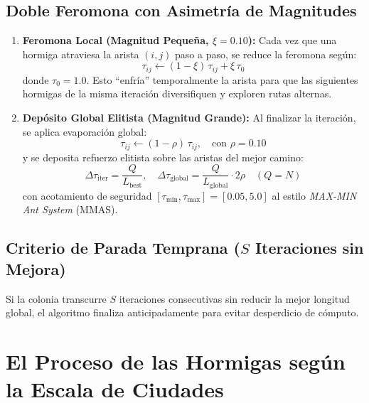 \documentclass[11pt,a4paper]{article}
\begin{document}
\subsection{Doble Feromona con Asimetría de Magnitudes}
\begin{enumerate}
    \item \textbf{Feromona Local (Magnitud Pequeña, $\xi = 0.10$):} Cada vez que una hormiga atraviesa la arista $(i, j)$ paso a paso, se reduce la feromona según:
    \begin{equation}
        \tau_{ij} \leftarrow (1 - \xi)\,\tau_{ij} + \xi\,\tau_0
    \end{equation}
    donde $\tau_0 = 1.0$. Esto ``enfría'' temporalmente la arista para que las siguientes hormigas de la misma iteración diversifiquen y exploren rutas alternas.
    \item \textbf{Depósito Global Elitista (Magnitud Grande):} Al finalizar la iteración, se aplica evaporación global:
    \begin{equation}
        \tau_{ij} \leftarrow (1 - \rho)\,\tau_{ij}, \quad \text{con } \rho = 0.10
    \end{equation}
    y se deposita refuerzo elitista sobre las aristas del mejor camino:
    \begin{equation}
        \Delta \tau_{\text{iter}} = \frac{Q}{L_{\text{best}}}, \quad \Delta \tau_{\text{global}} = \frac{Q}{L_{\text{global}}} \cdot 2\rho \quad (Q = N)
    \end{equation}
    con acotamiento de seguridad $[\tau_{\min}, \tau_{\max}] = [0.05, 5.0]$ al estilo \emph{MAX-MIN Ant System} (MMAS).
\end{enumerate}

\subsection{Criterio de Parada Temprana (\texorpdfstring{$S$}{S} Iteraciones sin Mejora)}
Si la colonia transcurre $S$ iteraciones consecutivas sin reducir la mejor longitud global, el algoritmo finaliza anticipadamente para evitar desperdicio de cómputo.

\section{El Proceso de las Hormigas según la Escala de Ciudades}
\end{document}
